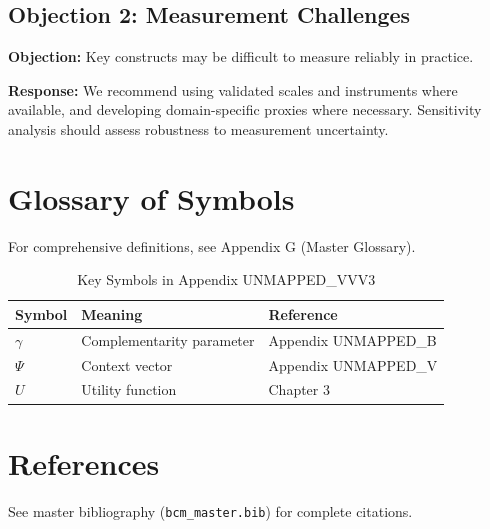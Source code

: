 \subsection{Objection 2: Measurement Challenges}

\textbf{Objection:} Key constructs may be difficult to measure reliably in
practice.

\textbf{Response:} We recommend using validated scales and instruments where
available, and developing domain-specific proxies where necessary. Sensitivity
analysis should assess robustness to measurement uncertainty.



\section{Glossary of Symbols}
\label{sec:vvv3-glossary}

For comprehensive definitions, see Appendix G (Master Glossary).

\begin{table}[htbp]
\centering
\caption{Key Symbols in Appendix UNMAPPED_VVV3}
\begin{tabular}{lll}
\toprule
\textbf{Symbol} & \textbf{Meaning} & \textbf{Reference} \\
\midrule
$\gamma$ & Complementarity parameter & Appendix UNMAPPED_B \\
$\Psi$ & Context vector & Appendix UNMAPPED_V \\
$U$ & Utility function & Chapter 3 \\
\bottomrule
\end{tabular}
\end{table}


\section{References}
\label{sec:references}

See master bibliography (\texttt{bcm\_master.bib}) for complete citations.

\nocite{bcm_master}



